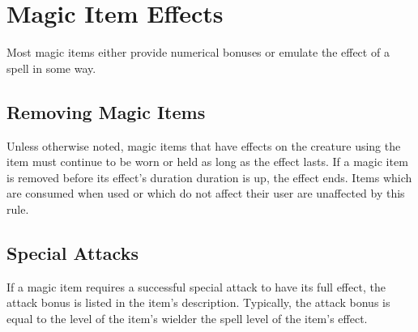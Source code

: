 \section{Magic Item Effects}
Most magic items either provide numerical bonuses or emulate the effect of a spell in some way.

\subsection{Removing Magic Items}
Unless otherwise noted, magic items that have effects on the creature using the item must continue to be worn or held as long as the effect lasts. If a magic item is removed before its effect's duration duration is up, the effect ends. Items which are consumed when used or which do not affect their user are unaffected by this rule.

\subsection{Special Attacks}

If a magic item requires a successful special attack to have its full effect, the attack bonus is listed in the item's description. Typically, the attack bonus is equal to the level of the item's wielder \add the spell level of the item's effect.

\begin{comment}
\subsection{Charges, Doses, and Multiple Uses}

Many items, particularly wands and staffs, are limited in power by the number of charges they hold. Normally, charged items have 50 charges at most. If such an item is found as a random part of a treasure, roll d\% and divide by 2 to determine the number of charges left (round down, minimum 1). If the item has a maximum number of charges other than 50, roll randomly to determine how many charges are left.

Prices listed are always for fully charged items. (When an item is created, it is fully charged.) An item with no charges left is worth half the price of a fully charged item. For an item that's worthless when its charges run out (which is the case for almost all charged items), the value of the partially used item is proportional to the number of charges left. For an item that has usefulness in addition to its charges, only part of the item's value is based on the number of charges left.
\end{comment}

